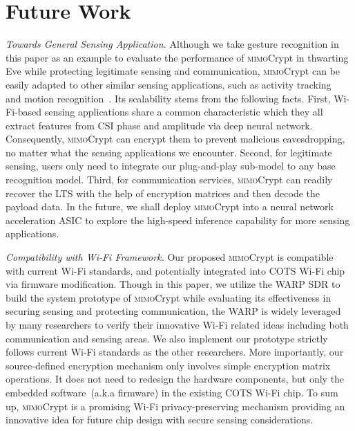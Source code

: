 \documentclass[conference,compsoc]{IEEEtran}
\newcommand{\name}{\textsc{mimo}Crypt\xspace}
\newcommand{\sname}{\textsc{mimo}Crypt\xspace}
\newcommand{\rev}[1]{{\color{blue}#1}}      %
\newcommand{\rev}[1]{#1}
\begin{document}
\balance
\section{Future Work}
%

\noindent\emph{Towards General Sensing Application.}
%
Although we take gesture recognition in this paper as an example to evaluate the performance of \sname in thwarting Eve while protecting legitimate sensing and communication, \sname can be easily adapted to other similar sensing applications, such as activity tracking~\cite{activity_rec} and motion recognition~\cite{WiDeo-NSDI15}. 
%
Its scalability stems from the following facts. First, Wi-Fi-based sensing applications share a common characteristic which they all extract features from CSI phase and amplitude via deep neural network. Consequently, \sname can encrypt them to prevent malicious eavesdropping, no matter what the sensing applications we encounter. Second, for legitimate sensing, users only need to integrate our plug-and-play sub-model to any base recognition model. Third, for communication services, \sname can readily recover the LTS with the help of encryption matrices and then decode the payload data. 
In the future, we shall deploy \sname into a neural network acceleration ASIC to explore the high-speed inference capability for more sensing applications. 

\vspace{1ex}
\noindent\emph{Compatibility with Wi-Fi Framework.}
%
Our proposed \sname is compatible with current Wi-Fi standards, and potentially integrated into COTS Wi-Fi chip via firmware modification. Though in this paper, we utilize the WARP SDR to build the system prototype of \sname while evaluating its effectiveness in securing sensing and protecting communication, the WARP is widely leveraged by many researchers to verify their innovative Wi-Fi related ideas including both communication and sensing areas. We also implement our prototype strictly follows current Wi-Fi standards as the other researchers. More importantly, our source-defined encryption mechanism only involves simple encryption matrix operations. It does not need to redesign the hardware components, but only the embedded software~(a.k.a firmware) in the existing COTS Wi-Fi chip. To sum up, \name is a promising Wi-Fi privacy-preserving mechanism providing an innovative idea for future chip design with secure sensing considerations. 
\end{document}
